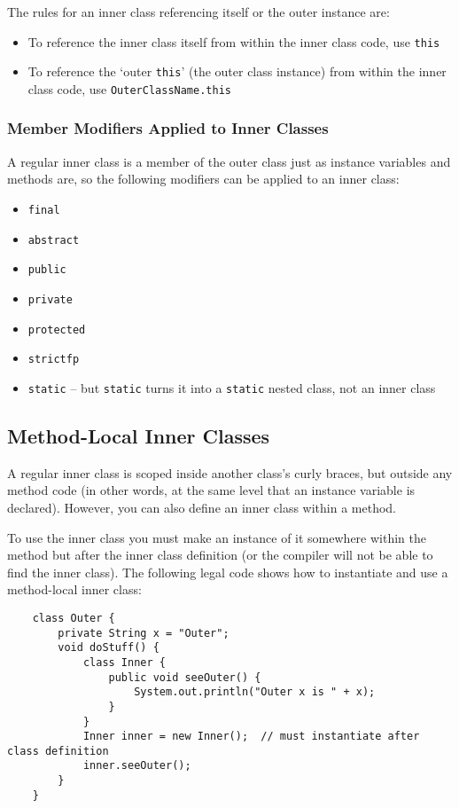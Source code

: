 The rules for an inner class referencing itself or the outer instance are:
\begin{itemize}
    \item To reference the inner class itself from within the inner class code, 
    use \verb#this#
    \item To reference the `outer \verb#this#' (the outer class instance) from 
    within the inner class code, use \verb#OuterClassName.this#
\end{itemize}

\subsubsection{Member Modifiers Applied to Inner Classes}
A regular inner class is a member of the outer class just as instance variables 
and methods are, so the following modifiers can be applied to an inner class:
\begin{itemize}
    \item \verb#final#
    \item \verb#abstract#
    \item \verb#public#
    \item \verb#private#
    \item \verb#protected#
    \item \verb#strictfp#
    \item \verb#static# -- but \verb#static# turns it into a \verb#static# 
    nested class, not an inner class
\end{itemize}

\subsection{Method-Local Inner Classes}
A regular inner class is scoped inside another class's curly braces, but 
outside any method code (in other words, at the same level that an instance 
variable is declared). However, you can also define an inner class within a 
method.

To use the inner class you must make an instance of it somewhere within the 
method but after the inner class definition (or the compiler will not be able 
to find the inner class). The following legal code shows how to instantiate and 
use a method-local inner class:
\begin{verbatim}
    class Outer {
        private String x = "Outer";
        void doStuff() {
            class Inner {
                public void seeOuter() {
                    System.out.println("Outer x is " + x);
                }
            }
            Inner inner = new Inner();  // must instantiate after class definition
            inner.seeOuter();
        }
    }
\end{verbatim}

